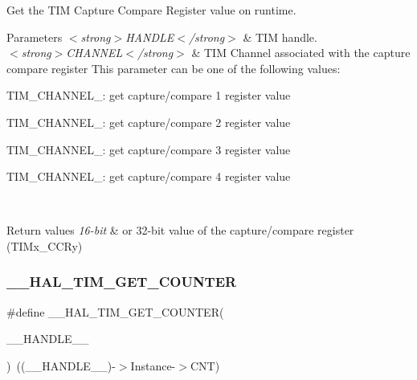Get the T\+IM Capture Compare Register value on runtime. 


\begin{DoxyParams}{Parameters}
{\em $<$strong$>$\+H\+A\+N\+D\+L\+E$<$/strong$>$} & T\+IM handle. \\
\hline
{\em $<$strong$>$\+C\+H\+A\+N\+N\+E\+L$<$/strong$>$} & T\+IM Channel associated with the capture compare register This parameter can be one of the following values\+: \begin{DoxyItemize}
\item T\+I\+M\+\_\+\+C\+H\+A\+N\+N\+E\+L\+\_\+: get capture/compare 1 register value \item T\+I\+M\+\_\+\+C\+H\+A\+N\+N\+E\+L\+\_\+: get capture/compare 2 register value \item T\+I\+M\+\_\+\+C\+H\+A\+N\+N\+E\+L\+\_\+: get capture/compare 3 register value \item T\+I\+M\+\_\+\+C\+H\+A\+N\+N\+E\+L\+\_\+: get capture/compare 4 register value \end{DoxyItemize}
\\
\hline
\end{DoxyParams}

\begin{DoxyRetVals}{Return values}
{\em 16-\/bit} & or 32-\/bit value of the capture/compare register (T\+I\+Mx\+\_\+\+C\+C\+Ry) \\
\hline
\end{DoxyRetVals}
\mbox{\label{group___t_i_m___exported___macros_gaf1af08014b9d06efbbb091d58d47c8ba}} 
\subsubsection{\texorpdfstring{\+\_\+\+\_\+\+H\+A\+L\+\_\+\+T\+I\+M\+\_\+\+G\+E\+T\+\_\+\+C\+O\+U\+N\+T\+ER}{\_\_HAL\_TIM\_GET\_COUNTER}}
{\footnotesize\ttfamily \#define \+\_\+\+\_\+\+H\+A\+L\+\_\+\+T\+I\+M\+\_\+\+G\+E\+T\+\_\+\+C\+O\+U\+N\+T\+ER(\begin{DoxyParamCaption}\item[{}]{\+\_\+\+\_\+\+H\+A\+N\+D\+L\+E\+\_\+\+\_\+ }\end{DoxyParamCaption})~((\+\_\+\+\_\+\+H\+A\+N\+D\+L\+E\+\_\+\+\_\+)-\/$>$Instance-\/$>$C\+NT)}



